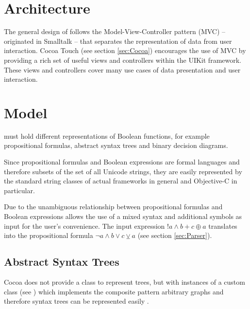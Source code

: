 
\section{Architecture}

The general design of \Nyaya follows the Model-View-Controller pattern (MVC)
– originated in Smalltalk \cite[p.4]{GAMMAETAL} –
that separates the representation of data from user interaction.
Cocoa Touch (see section \vref{sec:Cocoa}) encourages the use of MVC
by providing a rich set of useful views and controllers within the UIKit framework.
These views and controllers cover many use cases of data presentation and user interaction.

\section{Model}

\Nyaya must hold different representations of Boolean functions, 
for example propositional formulas, abstract syntax trees and binary decision diagrams. 

Since propositional formulas and Boolean expressions are formal languages 
and therefore subsets of the set of all Unicode strings,
they are easily represented by the standard string classes 
of actual frameworks in general and Objective-C in particular. 

Due to the unambiguous relationship between propositional formulas and Boolean expressions 
\Nyaya allows the use of a mixed syntax and additional symbols as input
for the user's convenience. The input expression $!a \wedge b + c \oplus a$ 
translates into the propositional formula
$\neg a \wedge b \vee c \veebar a$ (see section \vref{sec:Parser}).

\subsection{Abstract Syntax Trees}
\label{sec:AST}

Cocoa does not provide a class to represent trees, 
but with instances of a custom class (see )
which implements the composite pattern \cite[p.163ff]{GAMMAETAL}
arbitrary graphs and therefore syntax trees can be represented easily .

